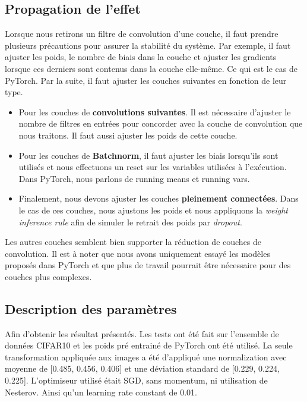 \documentclass[12pt]{article}
\begin{document}
\subsection{Propagation de l’effet}
Lorsque nous retirons un filtre de convolution d’une couche, il faut prendre plusieurs précautions pour assurer la stabilité du système. Par exemple, il faut ajuster les poids, le nombre de biais dans la couche et ajuster les gradients lorsque ces derniers sont contenus dans la couche elle-même. Ce qui est le cas de PyTorch.
\newpage
Par la suite, il faut ajuster les couches suivantes en fonction de leur type.
\begin{itemize}[noitemsep, noitemsep, label={}]
	\item Pour les couches de \textbf{convolutions suivantes}. Il est nécessaire d’ajuster le nombre de filtres en entrées pour concorder avec la couche de convolution que nous traitons. Il faut aussi ajuster les poids de cette couche. 
	\item Pour les couches de \textbf{Batchnorm}, il faut ajuster les biais lorsqu'ils sont utilisés et nous effectuons un reset sur les variables utilisées à l’exécution. Dans PyTorch, nous parlons de running means et running vars. 
	\item Finalement, nous devons ajuster les couches \textbf{pleinement connectées}. Dans le cas de ces couches, nous ajustons les poids et nous appliquons la \textit{weight inference rule}\cite{weightinference} afin de simuler le retrait des poids par \textit{dropout}. 
\end{itemize}

Les autres couches semblent bien supporter la réduction de couches de convolution. Il est à noter que nous avons uniquement essayé les modèles proposés dans PyTorch et que plus de travail pourrait être nécessaire pour des couches plus complexes. 

\subsection{Description des paramètres}
Afin d'obtenir les résultat présentés. Les tests ont été fait sur l'ensemble de données CIFAR10 et les poids pré entrainé de PyTorch ont été utilisé. La seule transformation appliquée aux images a été d'appliqué une normalization avec moyenne de [0.485, 0.456, 0.406] et une déviation standard de [0.229, 0.224, 0.225].
L'optimiseur utilisé était SGD, sans momentum, ni utilisation de Nesterov. Ainsi qu'un learning rate constant de 0.01.
\end{document}
